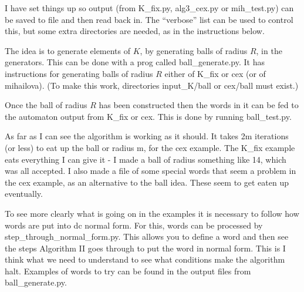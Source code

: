 \documentclass[a4paper,12pt]{article}
\numberwithin{equation}{section}
\numberwithin{figure}{section}
\begin{document}
I have set things up so output (from K\_fix.py, alg3\_cex.py or mih\_test.py) can be saved to file and then read back in.
The ``verbose'' list can be used to control this, but some extra directories are needed, as in the instructions below. 

The idea is to generate elements of $K$, by generating balls of radius $R$, in the generators. 
This can be done with a prog called ball\_generate.py. It has instructions for generating 
balls of radius $R$ either of K\_fix or cex (or of mihailova). 
(To make this work, directories input\_K/ball or cex/ball must exist.)

Once the ball of radius $R$ has been constructed then the words in it can be fed to the automaton output
from K\_fix or cex. This is done by running ball\_test.py. 

As far as I can see the algorithm is working as it should. It takes 2m iterations (or less) to eat up the ball or radius m,
for the cex example. The K\_fix example eats everything I can give it - I made a ball of radius something like 14, which was 
all accepted. I also made a file of some special words that seem a problem in the cex example, as an alternative
to the ball idea. These  seem to get eaten up eventually. 

To see more clearly what is going on in the examples it is necessary to follow how words are put into
dc normal form. For this, words can be processed by step\_through\_normal\_form.py.
This allows you to define a word and then 
see the steps Algorithm II goes through to put the word in normal form. This is I think what we 
need to understand to see what conditions make the algorithm halt. Examples of words to try can be found in the
output files from ball\_generate.py.
\end{document}
